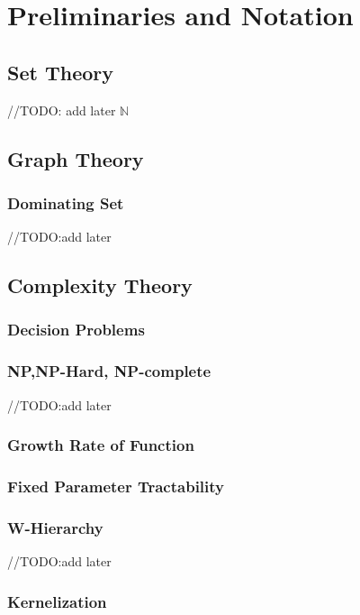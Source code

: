 \chapter{Preliminaries and Notation} \label{chap:prelim}
\section{Set Theory} \label{sec:set}
//TODO: add later 
$\mathds{N}$  
\section{Graph Theory}  \label{sec:graph}
\subsection{Dominating Set}
//TODO:add later
\section{Complexity Theory} \label{sec:complex}
\subsection{Decision Problems} \label{subsec:decision}
\subsection{NP,NP-Hard, NP-complete}
//TODO:add later
\subsection{Growth Rate of Function} \label{subsec:growth}
\subsection{Fixed Parameter Tractability} \label{subsec:fpt}
\subsection{W-Hierarchy} \label{subsec:whierarchy}
//TODO:add later
\subsection{Kernelization} \label{subsec:kern}
